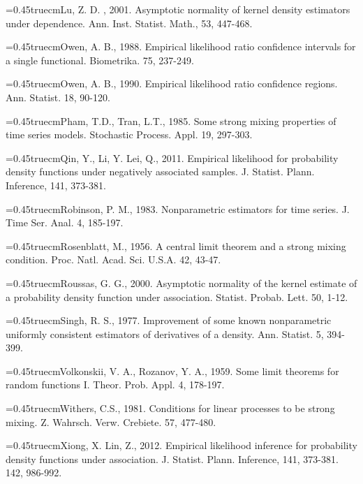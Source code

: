 \documentclass[12pt]{article}
\def\nh{\noindent\hangindent=0.45truecm\hangafter=1}
\begin{document}

\nh Lu, Z. D. , 2001. Asymptotic normality of kernel density estimators under dependence.  Ann.  Inst. Statist.  Math.,  53, 447-468.

\nh  Owen, A. B., 1988.  Empirical likelihood ratio confidence intervals for a single functional.
 Biometrika. 75, 237-249.

\nh  Owen, A. B., 1990. Empirical likelihood ratio confidence regions.
Ann. Statist. 18, 90-120.



\nh Pham, T.D., Tran, L.T., 1985. Some strong mixing properties of time series models. Stochastic Process. Appl. 19,  297-303.

\nh Qin, Y., Li, Y.  Lei, Q., 2011. Empirical likelihood for probability density functions
under negatively associated samples. J. Statist. Plann. Inference, 141, 373-381.

\nh Robinson, P. M., 1983. Nonparametric estimators for time series. J. Time Ser. Anal. 4, 185-197.

\nh Rosenblatt, M., 1956. A central limit theorem and a strong mixing condition. Proc. Natl.  Acad.
Sci. U.S.A. 42,  43-47.

\nh  Roussas, G. G., 2000. Asymptotic normality of the
kernel estimate of a probability density function under association.
Statist. Probab. Lett. 50, 1-12.



\nh  Singh, R. S., 1977. Improvement of some known nonparametric uniformly consistent estimators of
derivatives of a density.  Ann. Statist.  5, 394-399.

\nh Volkonskii, V. A., Rozanov, Y. A., 1959.  Some limit theorems for random functions I.  Theor. Prob.
Appl. 4, 178-197.

\nh Withers, C.S., 1981. Conditions for linear processes to be strong mixing. Z. Wahrsch. Verw. Crebiete. 57, 477-480.

\nh Xiong, X. Lin, Z., 2012. Empirical likelihood inference for probability density functions
under association. J. Statist. Plann. Inference, 141, 373-381. 142, 986-992.

\end{document}
